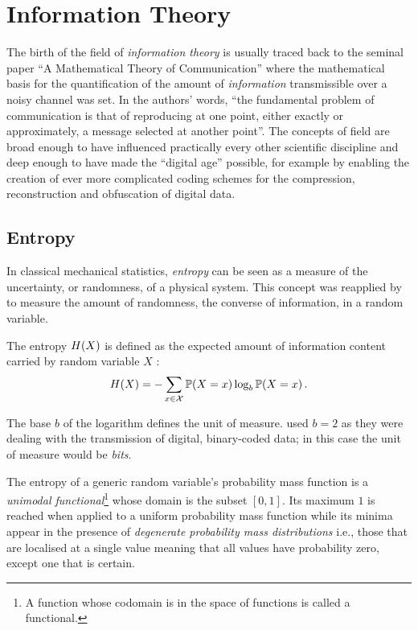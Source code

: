 \section{Information Theory} \label{sec:information-theory}
The birth of the field of \textit{information theory} is usually traced back to the seminal paper \enquote{A Mathematical Theory of Communication} \citep{Shannon1949} where the mathematical basis for the quantification of the amount of \textit{information} transmissible over a noisy channel was set. 
In the authors' words, \enquote{the fundamental problem of communication is that of reproducing at one point, either exactly or approximately, a message selected at another point}.
The concepts of field are broad enough to have influenced practically every other scientific discipline and deep enough to have made the \enquote{digital age} possible, for example by enabling the creation of ever more complicated coding schemes for the compression, reconstruction and obfuscation of digital data.

\subsection{Entropy} \label{subsec:entropy}
In classical mechanical statistics, \textit{entropy} can be seen as a measure of the uncertainty, or randomness, of a physical system.  
This concept was reapplied by \citet{Shannon1949} to measure the amount of randomness, the converse of information, in a random variable.
\begin{definition}[Entropy] \label{def:entropy}
	The entropy $H(X)$ is defined as the expected amount of information content carried by random variable $X$ \citep{Schneider2005}:
\begin{equation*}
	H(X) = -\sum\limits_{x \in \mathcal{X}} \mathbb{P}(X=x) \log_{b} \mathbb{P}(X=x) \,.
\end{equation*}
\end{definition}
The base $b$ of the logarithm defines the unit of measure.  
\citet{Shannon1949} used $b=2$ as they were dealing with the transmission of digital, binary-coded data; in this case the unit of measure would be \textit{bits}.

The entropy of a generic random variable's probability mass function is a \textit{unimodal functional}\footnote{A function whose codomain is in the space of functions is called a functional.} whose domain is the subset $[0,1]$.
Its maximum $1$ is reached when applied to a uniform probability mass function while its minima appear in the presence of \textit{degenerate probability mass distributions} i.e., those that are localised at a single value meaning that all values have probability zero, except one that is certain.

